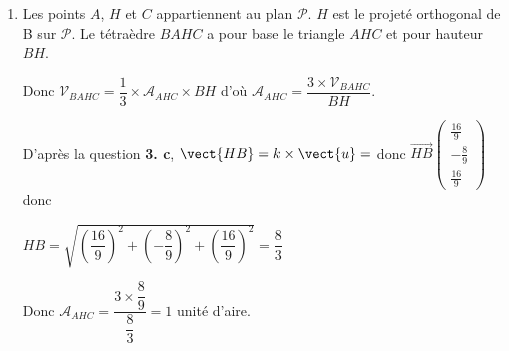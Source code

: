 \begin{enumerate}
\begin{enumerate}
Or les points $A$ et $H$ appartiennent au plan $\mathcal{P}$ normal à la droite $\mathcal{D}$, donc tout vecteur de $\mathcal{P}$ est orthogonal à tout vecteur de $\mathcal{D}$ donc $\vect{AH}\perp \vect{u}$ donc $\vect{AH}.\vect{u}=0$.

Donc $\vect{AB}.\vect{u}=\vect{HB}.\vect{u} = k \times \vect{u}.\vect{u}=k~\vect{u}^2=k~\lVert\vect{u}\rVert^2$ donc $k=\dfrac{\vect{AB}.\vect{u}}{\lVert\vect{u}\rVert^2}$.
	\item On a \(\overrightarrow{u}\begin{pmatrix}2\\-1\\2\end{pmatrix}\) donc $\lVert\vect{u}\rVert=\sqrt{2^2+(-1)^2+2^2}=\sqrt{9}=3$ et $\vect{AB}.\vect{u}=-8$ donc 
	
$k=\dfrac{-8}{3^2}=-\dfrac{8}{9}$.

Donc en posant $H(x~;~y~;~z)$ et $B(-1~;~3~;~0)$ alors \(\overrightarrow{HB}\begin{pmatrix}- 1 - x\\3 - y\\- z\end{pmatrix}\).

De plus $\vect{HB}=k\times \vect{u}=-\dfrac{8}{9}\times \vect{u}$ donc 	$\left\{\begin{array}{l c l}- 1 - x&=&-\dfrac{8}{9}\times 2\\3 - y &=& -\dfrac{8}{9}\times (- 1)\\-z&=&-\dfrac{8}{9}\times 2 \end{array}\right.$

Donc $x=\dfrac{16}{9}-1=\dfrac{7}{9}$ , $y=3-\dfrac{8}{9}=\dfrac{19}{9}$ et $z=\dfrac{16}{9}$. On retrouve les coordonnées du point $H$.
\end{enumerate}
		\item Les points $A$, $H$ et $C$ appartiennent au plan $\mathcal{P}$. $H$ est le projeté orthogonal de B sur  $\mathcal{P}$. Le tétraèdre $BAHC$ a pour base le triangle $AHC$ et pour hauteur $BH$.

Donc $\mathcal{V}_{BAHC}=\dfrac{1}{3}\times \mathcal{A}_{AHC}\times BH$ d'où $\mathcal{A}_{AHC}=\dfrac{3\times \mathcal{V}_{BAHC}}{BH}$.

D'après la question \textbf{3. c}, $\vect{HB}=k\times \vect{u}=$ donc \(\overrightarrow{HB}\begin{pmatrix}\frac{16}{9}\\-\frac{8}{9}\\\frac{16}{9}\end{pmatrix}\) donc

$HB=\sqrt{\left(\dfrac{16}{9}\right)^2+\left(-\dfrac{8}{9}\right)^2+\left(\dfrac{16}{9}\right)^2} = \dfrac{8}{3}$

Donc  $\mathcal{A}_{AHC}=\dfrac{3\times \dfrac{8}{9}}{\dfrac{8}{3}}=1$ unité d'aire.
\end{enumerate}

\bigskip
